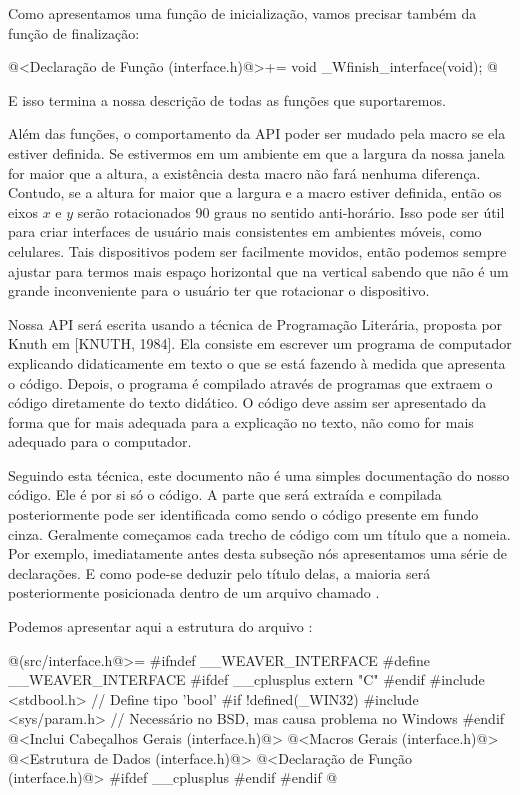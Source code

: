 Como apresentamos uma função de inicialização, vamos precisar também
da função de finalização:

\iniciocodigo
@<Declaração de Função (interface.h)@>+=
void _Wfinish_interface(void);
@
\fimcodigo

E isso termina a nossa descrição de todas as funções que
suportaremos.

Além das funções, o comportamento da API poder ser mudado pela
macro  se ela estiver definida. Se
estivermos em um ambiente em que a largura da nossa janela for maior
que a altura, a existência desta macro não fará nenhuma
diferença. Contudo, se a altura for maior que a largura e a macro
estiver definida, então os eixos $x$ e $y$ serão rotacionados 90 graus
no sentido anti-horário. Isso pode ser útil para criar interfaces de
usuário mais consistentes em ambientes móveis, como celulares. Tais
dispositivos podem ser facilmente movidos, então podemos sempre
ajustar para termos mais espaço horizontal que na vertical sabendo que
não é um grande inconveniente para o usuário ter que rotacionar o
dispositivo.


Nossa API será escrita usando a técnica de Programação Literária,
proposta por Knuth em [KNUTH, 1984]. Ela consiste em escrever um
programa de computador explicando didaticamente em texto o que se está
fazendo à medida que apresenta o código. Depois, o programa é
compilado através de programas que extraem o código diretamente do
texto didático. O código deve assim ser apresentado da forma que for
mais adequada para a explicação no texto, não como for mais adequado
para o computador.

Seguindo esta técnica, este documento não é uma simples documentação
do nosso código. Ele é por si só o código. A parte que será extraída e
compilada posteriormente pode ser identificada como sendo o código
presente em fundo cinza. Geralmente começamos cada trecho de código
com um título que a nomeia. Por exemplo, imediatamente antes desta
subseção nós apresentamos uma série de declarações. E como pode-se
deduzir pelo título delas, a maioria será posteriormente posicionada
dentro de um arquivo chamado .

Podemos apresentar aqui a estrutura do arquivo
:

\iniciocodigo
@(src/interface.h@>=
#ifndef __WEAVER_INTERFACE
#define __WEAVER_INTERFACE
#ifdef __cplusplus
extern "C" {
#endif
#include <stdbool.h> // Define tipo 'bool'
#if !defined(_WIN32)
#include <sys/param.h> // Necessário no BSD, mas causa problema no Windows
#endif
@<Inclui Cabeçalhos Gerais (interface.h)@>
@<Macros Gerais (interface.h)@>
@<Estrutura de Dados (interface.h)@>
@<Declaração de Função (interface.h)@>
#ifdef __cplusplus
}
#endif
#endif
@
\fimcodigo


